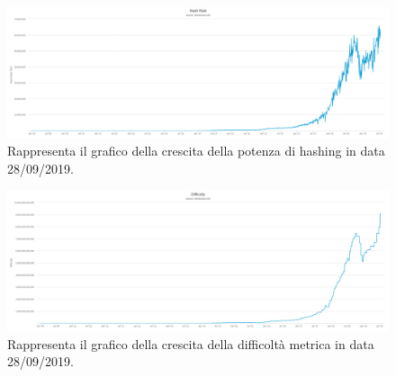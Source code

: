 \begin{figure}[H]
\includegraphics[width=1\columnwidth]{images/hash-rate.png}
\caption{Rappresenta il grafico della crescita della potenza di hashing in data 28/09/2019. }
\label{fig:hashrate}
\end{figure}

\begin{figure}[H]
\includegraphics[width=1\columnwidth]{images/difficulty.png}
\caption{Rappresenta il grafico della crescita della difficoltà metrica in data 28/09/2019.}
\label{fig:metrix}
\end{figure}
